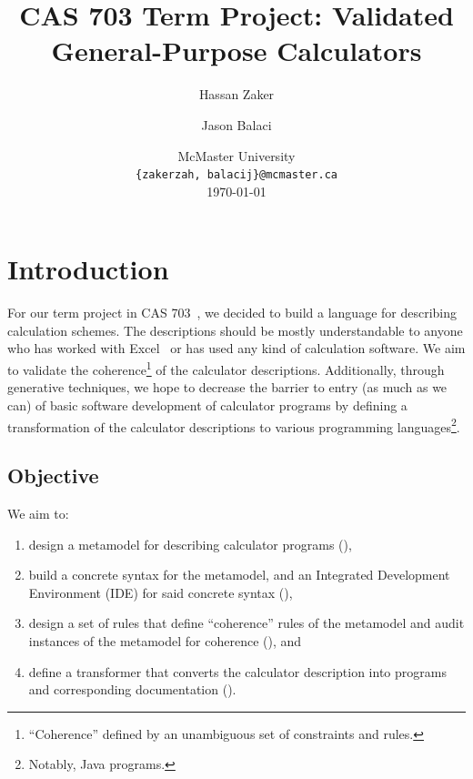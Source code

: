 \documentclass[11pt,fleqn]{article}
\title{\vspace{-3.5cm}CAS 703 Term Project: Validated General-Purpose Calculators}
\author{Hassan Zaker \and Jason Balaci}
\date{
	McMaster University \\ \texttt{\{zakerzah, balacij\}@mcmaster.ca}\\%
	\today
}
\begin{document}
\maketitle

\tableofcontents

\lstlistoflistings

\newpage{}

\section{Introduction}
\label{sec:introduction}

For our term project in CAS 703~\cite{Paige7032023}, we decided to build a
language for describing calculation schemes. The descriptions should be mostly
understandable to anyone who has worked with Excel~\cite{Excel} or has used any
kind of calculation software. We aim to validate the
coherence\footnote{``Coherence'' defined by an unambiguous set of constraints
and rules.} of the calculator descriptions. Additionally, through generative
techniques, we hope to decrease the barrier to entry (as much as we can) of
basic software development of calculator programs by defining a transformation
of the calculator descriptions to various programming
languages\footnote{Notably, Java programs.}.

\subsection{Objective}
\label{sec:introduction:subsec:objective}

We aim to:

\begin{enumerate}

  \item design a metamodel for describing calculator programs
        (),

  \item build a concrete syntax for the metamodel, and an Integrated Development
        Environment (IDE) for said concrete syntax
        (),

  \item design a set of rules that define ``coherence'' rules of the metamodel
        and audit instances of the metamodel for coherence
        (), and

  \item define a transformer that converts the calculator description into
        programs and corresponding documentation
        ().

\end{enumerate}
\end{document}
